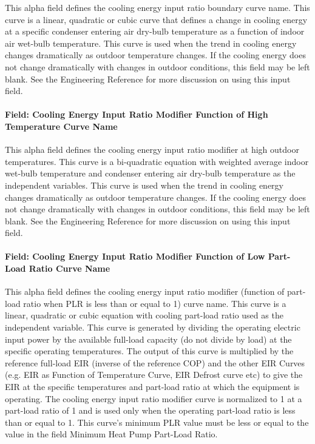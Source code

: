 This alpha field defines the cooling energy input ratio boundary curve name. This curve is a linear, quadratic or cubic curve that defines a change in cooling energy at a specific condenser entering air dry-bulb temperature as a function of indoor air wet-bulb temperature. This curve is used when the trend in cooling energy changes dramatically as outdoor temperature changes. If the cooling energy does not change dramatically with changes in outdoor conditions, this field may be left blank. See the Engineering Reference for more discussion on using this input field.

\paragraph{Field: Cooling Energy Input Ratio Modifier Function of High Temperature Curve Name}\label{field-cooling-energy-input-ratio-modifier-function-of-high-temperature-curve-name}

This alpha field defines the cooling energy input ratio modifier at high outdoor temperatures. This curve is a bi-quadratic equation with weighted average indoor wet-bulb temperature and condenser entering air dry-bulb temperature as the independent variables. This curve is used when the trend in cooling energy changes dramatically as outdoor temperature changes. If the cooling energy does not change dramatically with changes in outdoor conditions, this field may be left blank. See the Engineering Reference for more discussion on using this input field.

\paragraph{Field: Cooling Energy Input Ratio Modifier Function of Low Part-Load Ratio Curve Name}\label{field-cooling-energy-input-ratio-modifier-function-of-low-part-load-ratio-curve-name}

This alpha field defines the cooling energy input ratio modifier (function of part-load ratio when PLR is less than or equal to 1) curve name. This curve is a linear, quadratic or cubic equation with cooling part-load ratio used as the independent variable. This curve is generated by dividing the operating electric input power by the available full-load capacity (do not divide by load) at the specific operating temperatures. The output of this curve is multiplied by the reference full-load EIR (inverse of the reference COP) and the other EIR Curves (e.g. EIR as Function of Temperature Curve, EIR Defrost curve etc) to give the EIR at the specific temperatures and part-load ratio at which the equipment is operating. The cooling energy input ratio modifier curve is normalized to 1 at a part-load ratio of 1 and is used only when the operating part-load ratio is less than or equal to 1. This curve's minimum PLR value must be less or equal to the value in the field Minimum Heat Pump Part-Load Ratio.


